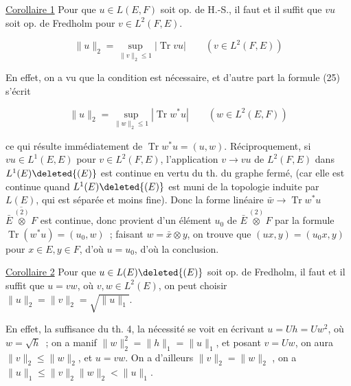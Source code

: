 \uline{Corollaire 1} Pour que $u\in L(E,F)$ soit op. de H.-S., il faut et il
suffit que  $vu$ soit op. de Fredholm pour  $v\in L^2(F,E)$.
 

\[
\|u\|_2=\sup_{\|v\|_2\leq1}|\operatorname{Tr}vu|\qquad(v\in L^2(F,E)) \tag*{(26)}
\]

En effet, on a vu que la condition est nécessaire, et
d'autre part la formule (25) s'écrit

\[
\|u\|_2=\sup_{\|w\|_2\leq1}|\operatorname{Tr}w^*u|\qquad(w\in L^2(E,F))
\]

ce qui résulte immédiatement de $\operatorname{Tr}w^*u=(u,w)$. Réciproquement,
si $vu\in L^1(E,E)$ pour  $v\in L^2(F,E)$,
l'application $v\to vu$ de $L^2(F,E)$ dans $L^1(E)\deleted{(E)}$
est continue en vertu du th. du graphe fermé,
(car elle est continue quand $L^1(E)\deleted{(E)}$ est muni de
la topologie induite par $L(E)$, qui est séparée et moins fine).
Donc la forme linéaire $\bar w\to\operatorname{Tr}w^*u$   $\overline{\bar E\overset{(2)}{\otimes}F}$ est
continue, donc provient d'un élément $u_0$ de $\bar E\overset{(2)}{\otimes}F$
par la formule  $\operatorname{Tr}(w^*u)=(u_0,w)$ \,; faisant
$w=\bar x\otimes y$, on trouve que $(ux,y)=(u_0x,y)$ pour
 $x\in E,y\in F$, d'où $u=u_0$, d'où la conclusion.


\uline{Corollaire 2} Pour que $u\in L(E)\deleted{(E)}$ soit op. de Fredholm,
il faut et il suffit que $u=vw$, où $v,w\in L^2(E)$, on
peut choisir $\|u\|_2=\|v\|_2=\sqrt{\|u\|_1}$.

En effet, la suffisance   du th. 4, la
nécessité se voit en écrivant $u=Uh=Uw^2$, où
$w=\sqrt h$ \,; on a manif $\|w\|_2^2=\|h\|_1=\|u\|_1$,
et posant $v=Uw$, on aura $\|v\|_2\leq\|w\|_2$, et
 $u=vw$. On a d'ailleurs $\|v\|_2=\|w\|_2$ , 
on a $\|u\|_1\leq\|v\|_2\|w\|_2<\|u\|_1$.

